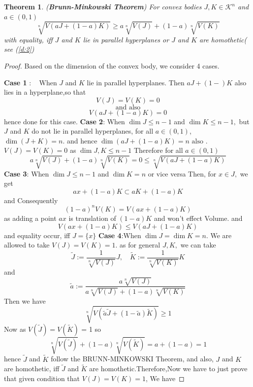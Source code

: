 \documentclass[oneside]{book}
\newtheorem{theorem}{Theorem}[section]
\begin{document}
	\begin{theorem}(\textbf{Brunn-Minkowski Theorem})
		\label{t:11}
		For convex bodies $J, K \in \mathcal{K}^{n}$ and $a \in(0,1)$
		\begin{equation}
		\label{eq54}
		\sqrt[n]{V(a J+(1-a) K)} \geq a \sqrt[n]{V(J)}+(1-a) \sqrt[n]{V(K)}
		\end{equation} \label{eq:4.19}
		with equality, iff $J$ and $K$ lie in parallel hyperplanes or $J$ and $K$ are homothetic( see (\ref{d:2})
	\end{theorem}
	\begin{proof}
		Based on the dimension of the convex body, we consider 4 cases.
		\hfill \break
		
		\textbf{Case 1} $: \quad \text{When } J$ and $K$ lie in parallel hyperplanes. Then  $a J+(1-) K$  also lies in a hyperplane,\quad so that $$V(J)=V(K)=0$$    $$\text{and also}$$ $$V(a J+(1-a) K)=0$$
		hence done for this case.
		\hfill \break
		\textbf{Case 2}: \quad  When $\operatorname{dim} J \leq n-1$ and $\operatorname{dim} K \leq n-1,$ but $J$ and $K$ do not lie in parallel hyperplanes, for all $a \in(0,1)$, $\operatorname{dim}(J+K)=n .$ and hence  $\operatorname{dim}(a J+(1-a) K)=n \text{ also }.$ 
		\hfill \break
		$V(J) = V(K)= 0$ as $\operatorname{dim} J,K \leq n-1 $ Therefore for all $a \in(0,1)$
		$$
		a \sqrt[n]{V(J)}+(1-a) \sqrt[n]{V(K)}=0 \leq \sqrt[n]{V(a J+(1-a) K)}
		$$
		\hfill \break
		\textbf{Case 3}: \quad  When $\operatorname{dim } J \leq n-1$ and $\operatorname{dim} K=n$ or vice versa
		\hfill \break 
		Then, for $x \in J,$ we get
		\[
		a x+(1-a) K \subset a K+(1-a) K
		\]
		and Consequently
		\[
		(1-a)^{n} V(K)=V(a x+(1-a) K) 
		\]
		as adding a point $a x $ is translation of $(1-a) K$ and won't effect Volume. 
		and
		$$ V(a x+(1-a) K) \leq V(a 
		J+(1-a) K)$$
		and equality occur, iff $J=\{x\}$ 
		\hfill \break
		\textbf{Case 4}:When $\operatorname{dim} J=\operatorname{dim} K=n .$  We are allowed to take $V(J)=V(K)=1 .$ as for general $J, K,$  we  can take
		\[
		\widetilde{J}:=\frac{1}{\sqrt[n]{V(J)}} J, \quad \widetilde{K}:=\frac{1}{\sqrt[n]{V(K)}} K
		\]
		and
		\[
		\widetilde{a}:=\frac{a \sqrt[n]{V(J)}}{a \sqrt[n]{V(J)}+(1-a) \sqrt[n]{V(K)}}
		\]
		Then we have
		\[
		\sqrt[n]{V({\widetilde{a} \widetilde{ J} }+(1-\widetilde{a}) \widetilde{K})} \geq 1
		\]
		Now  as $V(\widetilde{J}) = V(\widetilde{K})$ = 1 so $$\sqrt[n]{V(\widetilde{J})}+(1-a) \sqrt[n]{V(\widetilde {K})}=a+(1-a)=1$$
		hence $\widetilde{J}$ and $\widetilde{K}$
		follow the BRUNN-MINKOWSKI Theorem,  and also, $J$ and $K$ are homothetic, iff $\widetilde{J}$ and $\widetilde{K}$ are homothetic.Therefore,Now  we have to just prove that given condition that $V(J)=V(K)=1$, We have 

\end{proof}
\end{document}
